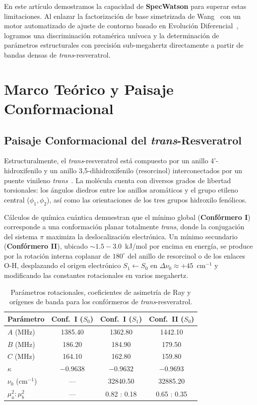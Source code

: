 \documentclass[aps,jcp,reprint,twocolumn,superscriptaddress,showpacs,amsmath,amssymb]{revtex4-2}
\begin{document}
En este art\'iculo demostramos la capacidad de \textbf{SpecWatson} para superar estas limitaciones. Al enlazar la factorizaci\'on de base simetrizada de Wang~\cite{wang1929degree} con un motor automatizado de ajuste de contorno basado en Evoluci\'on Diferencial~\cite{storn1997differential}, logramos una discriminaci\'on rotam\'erica un\'ivoca y la determinaci\'on de par\'ametros estructurales con precisi\'on sub-megahertz directamente a partir de bandas densas de \textit{trans}-resveratrol.

\section{Marco Te\'orico y Paisaje Conformacional}

\subsection{Paisaje Conformacional del \textit{trans}-Resveratrol}
Estructuralmente, el \textit{trans}-resveratrol est\'a compuesto por un anillo 4'-hidroxifenilo y un anillo 3,5-dihidroxifenilo (resorcinol) interconectados por un puente vinileno \textit{trans}~\cite{smeyers2004resveratrol}. La mol\'ecula cuenta con diversos grados de libertad torsionales: los \'angulos diedros entre los anillos arom\'aticos y el grupo etileno central ($\phi_1, \phi_2$), as\'i como las orientaciones de los tres grupos hidroxilo fen\'olicos.

C\'alculos de qu\'imica cu\'antica demuestran que el m\'inimo global (\textbf{Conf\'ormero I}) corresponde a una conformaci\'on planar totalmente \textit{trans}, donde la conjugaci\'on del sistema $\pi$ maximiza la deslocalizaci\'on electr\'onica. Un m\'inimo secundario (\textbf{Conf\'ormero II}), ubicado $\sim 1.5 - 3.0$~kJ/mol por encima en energ\'ia, se produce por la rotaci\'on interna coplanar de $180^\circ$ del anillo de resorcinol o de los enlaces O-H, desplazando el origen electr\'onico $S_1 \leftarrow S_0$ en $\Delta \nu_0 \approx +45$~cm$^{-1}$ y modificando las constantes rotacionales en varios megahertz.

\begin{table}[h]
\caption{Par\'ametros rotacionales, coeficientes de asimetr\'ia de Ray y or\'igenes de banda para los conf\'ormeros de \textit{trans}-resveratrol.}
\label{tab:resveratrol_constants}
\centering
\begin{tabular}{lccc}
\toprule
Par\'ametro & Conf.~I ($S_0$) & Conf.~I ($S_1$) & Conf.~II ($S_0$) \\
\midrule
$A$ (MHz) & 1385.40 & 1362.80 & 1442.10 \\
$B$ (MHz) & 186.20  & 184.90  & 179.50 \\
$C$ (MHz) & 164.10  & 162.80  & 159.80 \\
$\kappa$  & $-0.9638$ & $-0.9632$ & $-0.9693$ \\
$\nu_0$ (cm$^{-1}$) & --- & 32840.50 & 32885.20 \\
$\mu_a^2 : \mu_b^2$ & --- & 0.82 : 0.18 & 0.65 : 0.35 \\
\bottomrule
\end{tabular}
\end{table}
\end{document}
